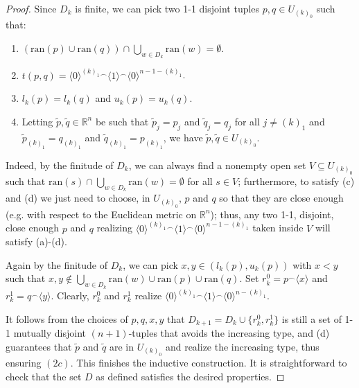 \documentclass[12pt]{amsart}
\theoremstyle{definition}
\theoremstyle{remark}
\begin{document}
\begin{proof}
Since $D_k$ is finite, we can pick two 1-1 disjoint tuples $p, q \in U_{(k)_0}$ such that:\vspace{0.3em}
\begin{enumerate}[label=(\alph*)]
\itemsep0.3em
\item $(\mathrm{ran}(p) \cup \mathrm{ran}(q)) \cap \bigcup_{w \in D_k} \mathrm{ran}(w) = \emptyset$.
\item $t(p,q) = \langle 0 \rangle^{(k)_1}{}^\smallfrown \langle 1 \rangle{}^\smallfrown \langle 0 \rangle^{n-1-(k)_1}$.
\item $l_k(p) = l_k(q)$ and $u_k(p) = u_k(q)$.
\item Letting $\tilde{p},\tilde{q} \in \mathbb{R}^n$ be such that $\tilde{p}_j = p_j$ and $\tilde{q}_j = q_j$ for all $j \neq (k)_1$ and $\tilde{p}_{(k)_1} = q_{(k)_1}$ and $\tilde{q}_{(k)_1} = p_{(k)_1}$, we have $\tilde{p},\tilde{q} \in U_{(k)_0}$.\vspace{0.3em}
\end{enumerate}
Indeed, by the finitude of $D_k$, we can always find a nonempty open set $V\subseteq U_{(k)_0}$ such that $\mathrm{ran}(s) \cap \bigcup_{w \in D_k} \mathrm{ran}(w) = \emptyset$ for all $s \in V$; furthermore, to satisfy (c) and (d) we just need to choose, in $U_{(k)_0}$, $p$ and $q$ so that they are close enough (e.g. with respect to the Euclidean metric on $\mathbb{R}^n$); thus, any two 1-1, disjoint, close enough $p$ and $q$ realizing $\langle 0 \rangle^{(k)_1}{}^\smallfrown \langle 1 \rangle{}^\smallfrown \langle 0 \rangle^{n-1-(k)_1}$ taken inside $V$ will satisfy (a)-(d).

Again by the finitude of $D_k$, we can pick $x,y \in (l_k(p), u_k(p))$ with $x < y$ such that $x,y \not\in \bigcup_{w \in D_k} \mathrm{ran}(w)\cup \mathrm{ran}(p) \cup \mathrm{ran}(q)$. Set $r_k^0 = p^\smallfrown \langle x\rangle$ and $r_k^1 = q^\smallfrown \langle y\rangle$. Clearly, $r_k^0$ and $r_k^1$ realize $\langle 0 \rangle^{(k)_1}{}^\smallfrown \langle 1 \rangle{}^\smallfrown \langle 0 \rangle^{n-(k)_1}$.

It follows from the choices of $p,q,x,y$ that $D_{k+1} = D_k \cup \{r_k^0, r_k^1\}$ is still a set of 1-1 mutually disjoint $(n+1)$-tuples that avoids the increasing type,
and (d) guarantees that $\tilde{p}$ and $\tilde{q}$ are in $U_{(k)_0}$ and realize the increasing type, thus ensuring $(2c)$.
This finishes the inductive construction. It is straightforward to check that the set $D$ as defined satisfies the desired properties.
\end{proof}
\end{document}
